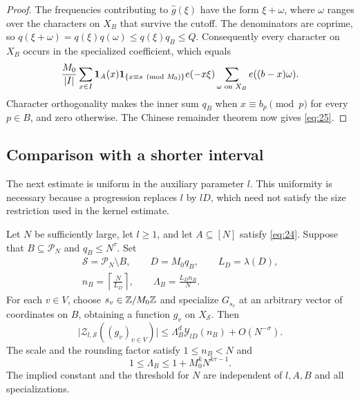 \begin{proof}
The frequencies contributing to $\widehat g(\xi)$ have the form
$\xi+\omega$, where $\omega$ ranges over the characters on $X_B$
that survive the cutoff.  The denominators are coprime, so
$q(\xi+\omega)=q(\xi)q(\omega)\le q(\xi)q_B\le Q$.
Consequently every character on $X_B$ occurs in the specialized
coefficient, which equals
\[
 \frac{M_0}{|I|}\sum_{x\in I}
 \mathbf 1_A(x)\mathbf 1_{\{x\equiv s\pmod{M_0}\}}e(-x\xi)
 \sum_{\omega\text{ on }X_B}e((b-x)\omega).
\]
Character orthogonality makes the inner sum $q_B$ when
$x\equiv b_p\pmod p$ for every $p\in B$, and zero otherwise.
The Chinese remainder theorem now gives \eqref{eq:25}.
\end{proof}

\subsection{Comparison with a shorter interval}

The next estimate is uniform in the auxiliary parameter $l$.  This
uniformity is necessary because a progression replaces $l$ by $lD$, which
need not satisfy the size restriction used in the kernel estimate.

\begin{proposition}\label{transfer:shorter-scale}
Let $N$ be sufficiently large, let $l\ge1$, and let $A\subseteq[N]$
satisfy \eqref{eq:24}.  Suppose that $B\subseteq\mathcal P_N$ and
$q_B\le N^\tau$.  Set
\begin{gather*}
 \mathcal S=\mathcal P_N\setminus B,
 \qquad D=M_0q_B,
 \qquad L_D=\lambda(D),\\
 n_B=\left\lceil\frac{N}{L_D}\right\rceil,
 \qquad \Lambda_B=\frac{L_Dn_B}{N}.
\end{gather*}
For each $v\in V$, choose $s_v\in\mathbb Z/M_0\mathbb Z$ and specialize $G_{s_v}$
at an arbitrary vector of coordinates on $B$, obtaining a function $g_v$
on $X_{\mathcal S}$.  Then
\begin{equation}\label{eq:26}
 \bigl|\mathcal Z_{l,\mathcal S}((g_v)_{v\in V})\bigr|
 \le \Lambda_B^d\mathcal Y_{lD}(n_B)+O(N^{-\sigma}).
\end{equation}
The scale and the rounding factor satisfy $1\le n_B<N$ and
\begin{equation}\label{eq:27}
 1\le\Lambda_B\le1+M_0^kN^{k\tau-1}.
\end{equation}
The implied constant and the threshold for $N$ are independent of
$l,A,B$ and all specializations.
\end{proposition}

